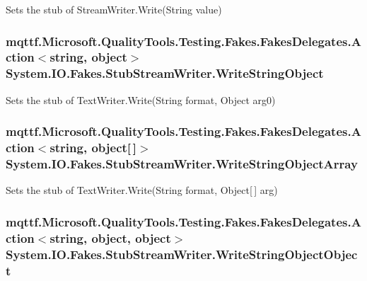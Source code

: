 Sets the stub of Stream\-Writer.\-Write(\-String value)

\hypertarget{class_system_1_1_i_o_1_1_fakes_1_1_stub_stream_writer_a4ecbe411f96d26955ede63333d1f526f}{
\subsubsection[{Write\-String\-Object}]{\setlength{\rightskip}{0pt plus 5cm}mqttf.\-Microsoft.\-Quality\-Tools.\-Testing.\-Fakes.\-Fakes\-Delegates.\-Action$<$string, object$>$ System.\-I\-O.\-Fakes.\-Stub\-Stream\-Writer.\-Write\-String\-Object}}\label{class_system_1_1_i_o_1_1_fakes_1_1_stub_stream_writer_a4ecbe411f96d26955ede63333d1f526f}


Sets the stub of Text\-Writer.\-Write(\-String format, Object arg0)

\hypertarget{class_system_1_1_i_o_1_1_fakes_1_1_stub_stream_writer_ad922750593efd0f12977dc2139932c4a}{
\subsubsection[{Write\-String\-Object\-Array}]{\setlength{\rightskip}{0pt plus 5cm}mqttf.\-Microsoft.\-Quality\-Tools.\-Testing.\-Fakes.\-Fakes\-Delegates.\-Action$<$string, object\mbox{[}$\,$\mbox{]}$>$ System.\-I\-O.\-Fakes.\-Stub\-Stream\-Writer.\-Write\-String\-Object\-Array}}\label{class_system_1_1_i_o_1_1_fakes_1_1_stub_stream_writer_ad922750593efd0f12977dc2139932c4a}


Sets the stub of Text\-Writer.\-Write(\-String format, Object\mbox{[}$\,$\mbox{]} arg)

\hypertarget{class_system_1_1_i_o_1_1_fakes_1_1_stub_stream_writer_aa5eae8ad92e34f4a1d25010f370c9b56}{
\subsubsection[{Write\-String\-Object\-Object}]{\setlength{\rightskip}{0pt plus 5cm}mqttf.\-Microsoft.\-Quality\-Tools.\-Testing.\-Fakes.\-Fakes\-Delegates.\-Action$<$string, object, object$>$ System.\-I\-O.\-Fakes.\-Stub\-Stream\-Writer.\-Write\-String\-Object\-Object}}\label{class_system_1_1_i_o_1_1_fakes_1_1_stub_stream_writer_aa5eae8ad92e34f4a1d25010f370c9b56}


